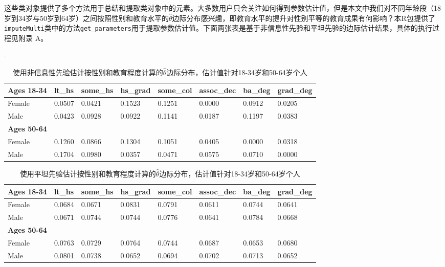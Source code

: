 \documentclass[12pt,hyperref,a4paper,UTF8]{ctexart}
\begin{document}
  这些类对象提供了多个方法用于总结和提取类对象中的元素。大多数用户只会关注如何得到参数估计值，但是本文中我们对不同年龄段（18岁到34岁与50岁到64岁）之间按照性别和教育水平的$\hat{\theta}$边际分布感兴趣，即教育水平的提升对性别平等的教育成果有何影响？本R包提供了\texttt{imputeMulti}类中的方法\texttt{get\_parameters}用于提取参数估计值。下面两张表是基于非信息性先验和平坦先验的边际估计结果，具体的执行过程见附录 A。
\begin{table}[H]
    \centering-
    \caption{使用非信息性先验估计按性别和教育程度计算的$\hat{\theta}$边际分布，估计值针对18-34岁和50-64岁个人}
      \begin{tabular}{l|lllllll}
      \hline
      \textbf{Ages 18-34} & lt\_hs & some\_hs & hs\_grad & some\_col & assoc\_dec & ba\_deg & grad\_deg\\
      \hline
      Female & 0.0507 & 0.0421 &0.1523 & 0.1251 & 0.0000 & 0.0912 & 0.0205 \\
      Male  & 0.0423 & 0.0928 & 0.0922 & 0.1141 & 0.0187 & 0.1197 & 0.0383 \\
      \hline
      \textbf{Ages 50-64} &       &       &       &       &       &       &\\  
      \hline
      Female & 0.1260 & 0.0866 & 0.1304 & 0.1051 & 0.0405 & 0.0000 & 0.0318 \\
      Male  & 0.1704 & 0.0980 & 0.0357 & 0.0471 & 0.0575 & 0.0710 & 0.0000 \\
      \hline
      \hline
      \end{tabular}%
  
  \end{table}%

  \begin{table}[H]
    \centering
    \caption{使用平坦先验估计按性别和教育程度计算的$\hat{\theta}$边际分布，估计值针对18-34岁和50-64岁个人}
      \begin{tabular}{l|lllllll}
      \hline
      \textbf{Ages 18-34} & lt\_hs & some\_hs & hs\_grad & some\_col & assoc\_dec & ba\_deg & grad\_deg\\
      \hline
      Female & 0.0684 & 0.0671 &0.0831 & 0.0791 & 0.0611 & 0.0744 & 0.0641 \\
      Male  & 0.0671 & 0.0744 & 0.0744 & 0.0776 & 0.0641 & 0.0784 & 0.0668 \\
      \hline
      \textbf{Ages 50-64} &       &       &       &       &       &       &\\  
      \hline
      Female & 0.0763 & 0.0729 & 0.0764 & 0.0744 & 0.0687 & 0.0653 & 0.0680 \\
      Male  & 0.0801 & 0.0738 & 0.0652 & 0.0694 & 0.0702 & 0.0713 & 0.0652 \\
      \hline
      \hline
      \end{tabular}%
  
  \end{table}%
\end{document}
